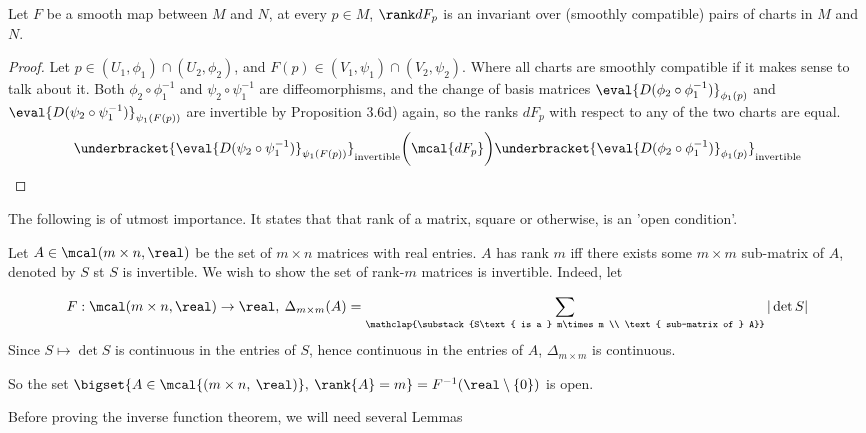 \documentclass[../main-v2-manifolds.tex]{subfiles}
\begin{document}
\begin{wts}\label{lee-chap3:rank-of-differential-invariant-under-coordinate-change}
    Let $F$ be a smooth map between $M$ and $N$, at every $p\in M$, $\rank dF_p$ is an invariant over (smoothly compatible) pairs of charts in $M$ and $N$.
\end{wts}
\begin{proof}
    Let $p\in (U_1,\phi_1)\cap (U_2,\phi_2)$, and $F(p)\in (V_1,\psi_1)\cap (V_2,\psi_2)$. Where all charts are smoothly compatible if it makes sense to talk about it. Both $\phi_2\circ\phi_1^{-1}$ and $\psi_2\circ\psi_1^{-1}$ are diffeomorphisms, and the change of basis matrices $\eval{D(\phi_2\circ\phi_1^{-1})}_{\phi_1(p)}$ and $\eval{D(\psi_2\circ\psi_1^{-1})}_{\psi_1(F(p))}$ are invertible by Proposition 3.6d) again, so the ranks $dF_p$ with respect to any of the two charts are equal.
    \[
        \underbracket{\eval{D(\psi_2\circ\psi_1^{-1})}_{\psi_1(F(p))}}_{\text{invertible}}\biggl(\mcal\{dF_p\}\biggr)\underbracket{\eval{D(\phi_2\circ\phi_1^{-1})}_{\phi_1(p)}}_{\text{invertible}}
    \]
\end{proof}

\newpage

The following is of utmost importance. It states that that rank of a matrix, square or otherwise, is an 'open condition'.
\begin{example}\label{lee-chp4:example-1.28-matrices-of-full-rank}
Let $A\in\mcal({m\times n,\real})$ be the set of $m\times n$ matrices with real entries. $A$ has rank $m$ iff there exists some $m\times m$ sub-matrix of $A$, denoted by $S$ st $S$ is invertible. We wish to show the set of rank-$m$ matrices is invertible. Indeed, let 

\[
F:\mcal({m\times n,\real})\to \real,\: \Delta_{m\times m}(A) = \sum_{\mathclap{\substack{S\text{ is a } m\times m \\ \text{ sub-matrix of } A}}}|\det{S}|
\]
Since $S\mapsto \det{S}$ is continuous in the entries of $S$, hence continuous in the entries of $A$, $\Delta_{m\times m}$ is continuous.

So the set $\bigset{A\in\mcal{(m\times n,\: \real)},\: \rank{A}=m}=F^{-1}(\real\setminus\{0\})$ is open.
\end{example}

Before proving the inverse function theorem, we will need several Lemmas
\end{document}
